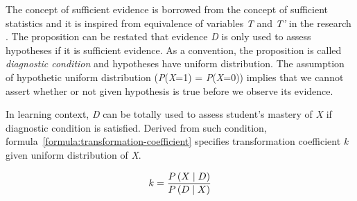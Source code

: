 \documentclass{article}
\numberwithin{equation}{section}
\numberwithin{figure}{section}
\numberwithin{table}{section}
\begin{document}
The concept of sufficient evidence is borrowed from the concept of sufficient statistics and it is inspired from equivalence of variables \textit{T} and \textit{T'} in the research \cite[pp.~292-295]{millan:bayesiandiagnostic}. The proposition can be restated that evidence \textit{D} is only used to assess hypotheses if it is sufficient evidence. As a convention, the proposition is called \textit{diagnostic condition} and hypotheses have uniform distribution. The assumption of hypothetic uniform distribution (\textit{P}(\textit{X}=1) = \textit{P}(\textit{X}=0)) implies that we cannot assert whether or not given hypothesis is true before we observe its evidence.

In learning context, \textit{D} can be totally used to assess student's mastery of \textit{X} if diagnostic condition is satisfied. Derived from such condition, formula~\ref{formula:transformation-coefficient} specifies transformation coefficient \textit{k} given uniform distribution of \textit{X}.

\begin{equation}
k=\frac{P\left(X\mathrel{\left|\vphantom{X D}\right.\kern-\nulldelimiterspace}D\right)}{P\left(D\mathrel{\left|\vphantom{D X}\right.\kern-\nulldelimiterspace}X\right)} 
\label{formula:transformation-coefficient}
\end{equation}
\end{document}
